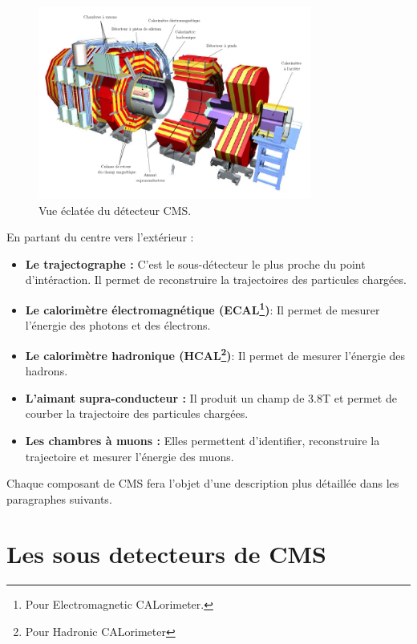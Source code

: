 \begin{figure}
	\centering
	\includegraphics[width=0.80\textwidth]{CMS/cms.png}
	\caption{\label{cmsexploded}Vue éclatée du détecteur CMS.}
\end{figure}
\newpage
En partant du centre vers l'extérieur :
\begin{itemize}[label=$\bullet$]
	\item \textbf{Le trajectographe : } C'est le sous-détecteur le plus proche du point d'intéraction. Il permet de reconstruire la trajectoires des particules chargées.
	 \item \textbf{Le calorimètre électromagnétique (ECAL\footnote{Pour Electromagnetic CALorimeter.})}: Il permet de mesurer l'énergie des photons et des électrons.
	 \item \textbf{Le calorimètre hadronique (HCAL\footnote{Pour Hadronic CALorimeter})}: Il permet de mesurer l'énergie des hadrons.
	 \item \textbf{L'aimant supra-conducteur : } Il produit un champ de 3.8T et permet de courber la trajectoire des particules chargées.
	 \item \textbf{Les chambres à muons : } Elles permettent d'identifier, reconstruire la trajectoire et mesurer l'énergie des muons. 
\end{itemize}
Chaque composant de CMS fera l'objet d'une description plus détaillée dans les paragraphes suivants.

\section{Les sous detecteurs de CMS}
